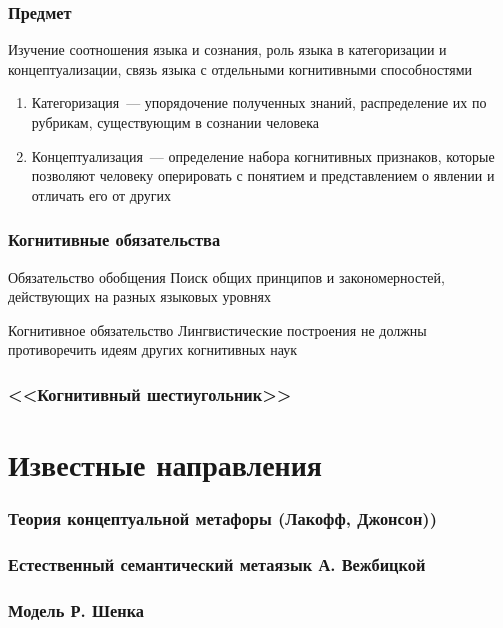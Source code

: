 \begin{frame}
  \frametitle{Предмет}
  Изучение соотношения языка и сознания, роль языка в категоризации и концептуализации, связь языка с отдельными когнитивными способностями

  \vfill

  \begin{enumerate}
    \item Категоризация~--- упорядочение полученных знаний, распределение их по рубрикам, существующим в сознании человека
    \item Концептуализация~--- определение набора когнитивных признаков, которые позволяют человеку оперировать с понятием и представлением о явлении и отличать его от других
  \end{enumerate}
\end{frame}

\begin{frame}
  \frametitle{Когнитивные обязательства}

  \begin{block}{Обязательство обобщения}
    Поиск общих принципов и закономерностей, действующих на разных языковых уровнях
  \end{block}

  \begin{block}{Когнитивное обязательство}
    Лингвистические построения не должны противоречить идеям других когнитивных наук
  \end{block}
\end{frame}

\begin{frame}
  \frametitle{<<Когнитивный шестиугольник>>}

  \begin{center}
  \end{center}
\end{frame}

\section{Известные направления}
\frame{\tableofcontents[currentsection]}

\begin{frame}
  \frametitle{Теория концептуальной метафоры (Лакофф, Джонсон))}


\end{frame}

\begin{frame}
  \frametitle{Естественный семантический метаязык А. Вежбицкой}


\end{frame}

\begin{frame}
  \frametitle{Модель Р. Шенка}


\end{frame}
